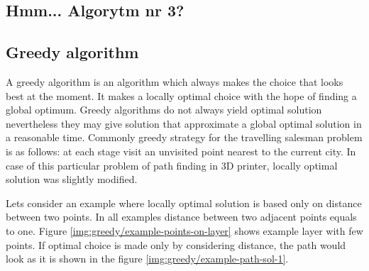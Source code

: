\documentclass[titlepage]{article}
\begin{document}
\subsection{Hmm... Algorytm nr 3?}


\subsection{Greedy algorithm}

A greedy algorithm is an algorithm which always makes the choice that looks best at the moment. It makes a locally optimal choice with the hope of finding a global optimum. Greedy algorithms do not always yield optimal solution nevertheless they may give solution that approximate a global optimal solution in a reasonable time. Commonly greedy strategy for the travelling salesman problem is as follows: at each stage visit an unvisited point nearest to the current city. In case of this particular problem of path finding in 3D printer, locally optimal solution was slightly modified.

Lets consider an example where locally optimal solution is based only on distance between two points. In all examples distance between two adjacent points equals to one. Figure \ref{img:greedy/example-points-on-layer} shows example layer with few points. If optimal choice is made only by considering distance, the path would look as it is shown in the figure \ref{img:greedy/example-path-sol-1}.
\end{document}
